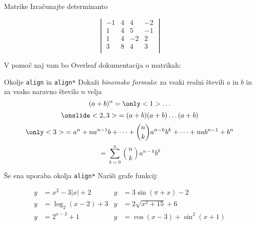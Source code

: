 
\begin{frame}{Matrike}
	Izračunajte determinanto

		\[
		\begin{vmatrix}
		-1 & 4 & 4 & -2 \\
		1 & 4 & 5 & -1 \\
		1 & 4 & -2 & 2 \\
		3 & 8 & 4 & 3 \\

		\end{vmatrix}
		\] 
	
	V pomoč naj vam bo Overleaf dokumentacija o matrikah:
	
	\href{https://www.overleaf.com/learn/latex/Matrices}{}
\end{frame}

\begin{frame}{Okolje \texttt{align} in \texttt{align*}}
	Dokaži \emph{binomsko formulo}: za vsaki realni števili $a$ in $b$ in za vsako naravno število $n$ velja
	\[
	(a+b)^n = \only<1>{\ldots}
	\]
	\[
	\onslide<2,3>{= (a+b) (a+b) \dots (a+b)}
	\]
	\[
	\only<3>{= a^n + n a^{n-1} b + \dots + \binom{n}{k} a^{n-k} b^k + \dots + n a b^{n-1} + b^n}
	\]
	\[
	= \sum_{k=0}^n \binom{n}{k} a^{n-k} b^k
	\]
\end{frame}

\begin{frame}{Še ena uporaba okolja \texttt{align*}}
	Nariši grafe funkcij:

	
	\begin{align*}
		y &= x^2 - 3|x| + 2 & y &= 3 \sin(\pi + x) - 2 \\
		y &= \log_2(x - 2) + 3 & y &= 2\sqrt{x^2 + 15} + 6 \\
		y &= 2^{x-3} + 1 & y &= \cos(x - 3) + \sin^2(x + 1)
	\end{align*}
	

\end{frame}


